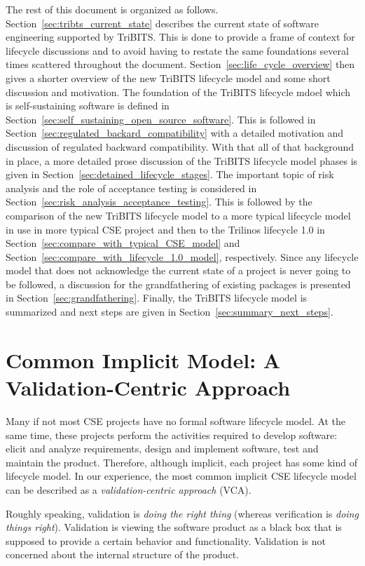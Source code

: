 \documentclass[11pt]{SANDreport}
\begin{document}
The rest of this document is organized as follows.
Section~\ref{sec:tribts_current_state} describes the current state of
software engineering supported by TriBITS.  This is done to provide a
frame of context for lifecycle discussions and to avoid having to
restate the same foundations several times scattered throughout the
document.  Section~\ref{sec:life_cycle_overview} then gives a shorter
overview of the new TriBITS lifecycle model and some short discussion
and motivation.  The foundation of the TriBITS lifecycle mdoel which
is self-sustaining software is defined in
Section~\ref{sec:self_sustaining_open_source_software}.  This is
followed in Section~\ref{sec:regulated_backard_compatibility} with a
detailed motivation and discussion of regulated backward
compatibility.  With that all of that background in place, a more
detailed prose discussion of the TriBITS lifecycle model phases is
given in Section~\ref{sec:detained_lifecycle_stages}.  The important
topic of risk analysis and the role of acceptance testing is
considered in Section~\ref{sec:risk_analysis_acceptance_testing}.
This is followed by the comparison of the new TriBITS lifecycle model
to a more typical lifecycle model in use in more typical CSE project
and then to the Trilinos lifecycle 1.0 in
Section~\ref{sec:compare_with_typical_CSE_model} and
Section~\ref{sec:compare_with_lifecycle_1.0_model}, respectively.
Since any lifecycle model that does not acknowledge the current state
of a project is never going to be followed, a discussion for the
grandfathering of existing packages is presented in
Section~\ref{sec:grandfathering}.  Finally, the TriBITS lifecycle
model is summarized and next steps are given in
Section~\ref{sec:summary_next_steps}.

%
{}\section {Common Implicit Model: A Validation-Centric Approach}
\label{sec:validation_centric_approach}

Many if not most CSE projects have no formal software lifecycle model.  At the same time, these projects perform the activities required to develop software: elicit and analyze requirements, design and implement software, test and maintain the product.  Therefore, although implicit, each project has some kind of lifecycle model.  In our experience, the most common implicit CSE lifecycle model can be described as a \textit{validation-centric approach} (VCA).  

Roughly speaking, validation is \textit{doing the right thing} (whereas verification is \textit{doing things right}).  Validation is viewing the software product as a black box that is supposed to provide a certain behavior and functionality.  Validation is not concerned about the internal structure of the product.
\end{document}
